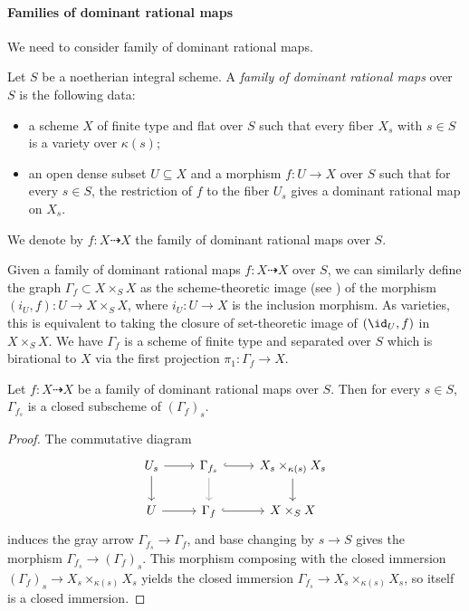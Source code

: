 \paragraph{Families of dominant rational maps}
We need to consider family of dominant rational maps.
\begin{definition}
	Let $S$ be a noetherian integral scheme.
	A \emph{family of dominant rational maps} over $S$ is the following data:
	\begin{itemize}
		\item a scheme $X$ of finite type and flat over $S$ such that every fiber $X_s$ with $s \in S$ is a variety over $\kappa(s)$;
		\item an open dense subset $U \subseteq X$ and a morphism $f: U \to X$ over $S$ such that for every $s \in S$, the restriction of $f$ to the fiber $U_s$ gives a dominant rational map on $X_s$.
	\end{itemize}
	We denote by $f: X \dashrightarrow X$ the family of dominant rational maps over $S$.
\end{definition}

Given a family of dominant rational maps $f: X \dashrightarrow X$ over $S$, we can similarly define the graph $\Gamma_f \subset X \times_S X$ as the scheme-theoretic image (see \cite[Tag 01R5]{Stacks}) of the morphism $(i_U, f): U \to X \times_S X$, where $i_U: U \to X$ is the inclusion morphism.
As varieties, this is equivalent to taking the closure of set-theoretic image of $(\id_U, f)$ in $X \times_S X$.
We have $\Gamma_f$ is a scheme of finite type and separated over $S$ which is birational to $X$ via the first projection $\pi_1: \Gamma_f \to X$.

\begin{proposition}
	Let $f: X \dashrightarrow X$ be a family of dominant rational maps over $S$.
	Then for every $s \in S$, $\Gamma_{f_s}$ is a closed subscheme of $(\Gamma_f)_s$.
\end{proposition}
\begin{proof}
	The commutative diagram
	\[
		\begin{tikzcd}
			U_s \ar[r] \ar[d] & \Gamma_{f_s} \ar[r, hook] \ar[d,gray] & X_s \times_{\kappa(s)} X_s \ar[d] \\
			U \ar[r] & \Gamma_f \ar[r, hook] & X \times_S X
		\end{tikzcd}
	\]
	induces the gray arrow $\Gamma_{f_s} \to \Gamma_f$, and base changing by $s \to S$ gives the morphism $\Gamma_{f_s} \to (\Gamma_f)_s$.
	This morphism composing with the closed immersion $(\Gamma_f)_s \to X_s \times_{\kappa(s)} X_s$ yields the closed immersion $\Gamma_{f_s} \to X_s \times_{\kappa(s)} X_s$, so itself is a closed immersion.
\end{proof}

